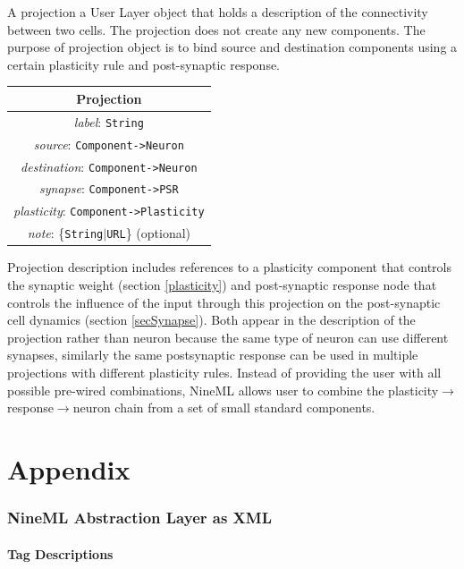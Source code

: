 \documentclass{article}
\begin{document}
A projection a User Layer object that holds a description of the connectivity
between two cells. The projection does not create any new components. The
purpose of projection object is to bind source and destination components
using a certain plasticity rule and post-synaptic response.

\begin{table}[htb]
\center
\begin{tabular}{|c|}
\hline
\hline
Projection \\
\hline
\hline
{\em label}: {\tt String} \\
\hline
{\em source}: {\tt Component->Neuron} \\
\hline
{\em destination}: {\tt Component->Neuron} \\
\hline
{\em synapse}: {\tt Component->PSR} \\
\hline
{\em plasticity}: {\tt Component->Plasticity} \\
\hline
{\em note}: \{{\tt String}$|${\tt URL}\} (optional)\\
\hline
\end{tabular}
\end{table}

Projection description includes references to a plasticity component
that controls the synaptic weight (section \ref{plasticity}) and
post-synaptic response node that controls the influence of the input
through this projection on the post-synaptic cell dynamics (section
\ref{secSynapse}). Both appear in the description of the projection
rather than neuron because the same type of neuron can use different
synapses, similarly the same postsynaptic response can be used in
multiple projections with different plasticity rules. Instead of providing
the user with all possible pre-wired combinations, NineML allows user
to combine the plasticity$\rightarrow$response$\rightarrow$neuron
chain from a set of small standard components.

\newpage
\appendix

\part*{Appendix}

\section{NineML Abstraction Layer as XML}

\subsection{Tag Descriptions}
\end{document}
